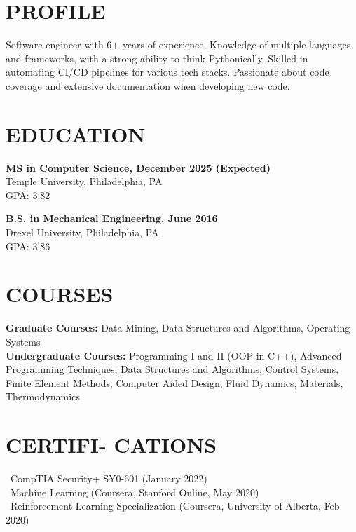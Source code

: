\documentclass[line,resmargin]{res}
\begin{document}
\address{ https://www.andygnias.com/ }
\begin{resume}

\section{PROFILE}
Software engineer with 6+ years of experience. Knowledge of multiple languages and frameworks, with a strong ability to think Pythonically. 
Skilled in automating CI/CD pipelines for various tech stacks. Passionate about code coverage and extensive documentation when developing new code.
 
\section{EDUCATION}
\textbf{MS in Computer Science, December 2025 (Expected)} \\
Temple University, Philadelphia, PA \\
GPA: 3.82

\textbf{B.S. in Mechanical Engineering, June 2016} \\
Drexel University, Philadelphia, PA \\
GPA: 3.86

\section{COURSES}
\textbf{Graduate Courses:} Data Mining, Data Structures and Algorithms, Operating Systems \\
\textbf{Undergraduate Courses:} Programming I and II (OOP in C++), Advanced Programming Techniques, Data Structures and Algorithms, Control Systems, Finite Element Methods, Computer Aided Design, Fluid Dynamics, Materials, Thermodynamics

\section{CERTIFI- CATIONS}
\textbullet\ CompTIA Security+ SY0-601 (January 2022) \\
\textbullet\ Machine Learning (Coursera, Stanford Online, May 2020) \\
\textbullet\ Reinforcement Learning Specialization (Coursera, University of Alberta, Feb 2020)
	

\end{resume}
\end{document}
